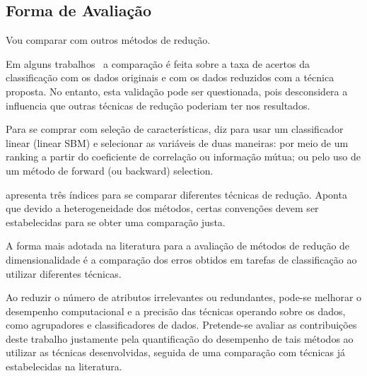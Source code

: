 \subsection{Forma de Avaliação}


Vou comparar com outros métodos de redução.

Em alguns trabalhos~\cite{Joshi2007} a comparação é feita sobre a taxa de acertos da classificação com os dados originais e com os dados reduzidos com a técnica proposta. No entanto, esta validação pode ser questionada, pois desconsidera a influencia que outras técnicas de redução poderiam ter nos resultados.

Para se comprar com seleção de características, \cite{Guyon2003} diz para usar um classificador linear (linear SBM) e selecionar as variáveis de duas maneiras: por meio de um ranking a partir do coeficiente de correlação ou informação mútua; ou pelo uso de um método de forward (ou backward) selection.

\cite{Medeiros2011} apresenta três índices para se comparar diferentes técnicas de redução. Aponta que devido a heterogeneidade dos métodos, certas convenções devem ser estabelecidas para se obter uma comparação justa.

A forma mais adotada na literatura para a avaliação de métodos de redução de dimensionalidade é a comparação dos erros obtidos em tarefas de classificação ao utilizar diferentes técnicas. 

Ao reduzir o número de atributos irrelevantes ou redundantes, pode-se melhorar o desempenho computacional e a precisão das técnicas operando sobre os dados, como agrupadores e classificadores de dados. Pretende-se avaliar as contribuições deste trabalho justamente pela quantificação do desempenho de tais métodos ao utilizar as técnicas desenvolvidas, seguida de uma comparação com técnicas já estabelecidas na literatura.




